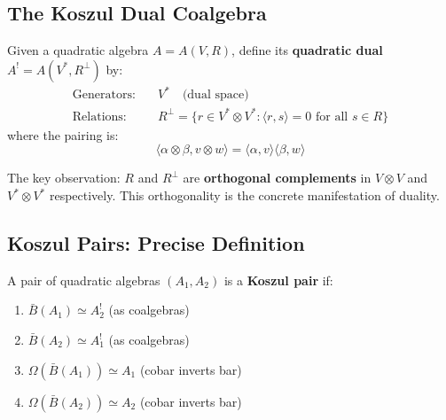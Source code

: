\subsection{The Koszul Dual Coalgebra}

\begin{construction}
\label{const:quadratic-dual}
Given a quadratic algebra $A = A(V,R)$, define its \textbf{quadratic dual} $A^! = A(V^*, R^\perp)$ by:
\begin{align}
\text{Generators:} &\quad V^* \quad \text{(dual space)} \\
\text{Relations:} &\quad R^\perp = \{r \in V^* \otimes V^* : \langle r, s \rangle = 0 \text{ for all } s \in R\}
\end{align}
where the pairing is:
\begin{equation}
\langle \alpha \otimes \beta, v \otimes w \rangle = \langle \alpha, v \rangle \langle \beta, w \rangle
\end{equation}
\end{construction}

\begin{remark}
The key observation: $R$ and $R^\perp$ are \textbf{orthogonal complements} in $V \otimes V$ and $V^* \otimes V^*$ respectively. This orthogonality is the concrete manifestation of duality.
\end{remark}

\subsection{Koszul Pairs: Precise Definition}

\begin{definition}
\label{def:koszul-pair-classical}
A pair of quadratic algebras $(A_1, A_2)$ is a \textbf{Koszul pair} if:
\begin{enumerate}
\item $\bar{B}(A_1) \simeq A_2^!$ (as coalgebras)
\item $\bar{B}(A_2) \simeq A_1^!$ (as coalgebras)
\item $\Omega(\bar{B}(A_1)) \simeq A_1$ (cobar inverts bar)
\item $\Omega(\bar{B}(A_2)) \simeq A_2$ (cobar inverts bar)
\end{enumerate}
\end{definition}

